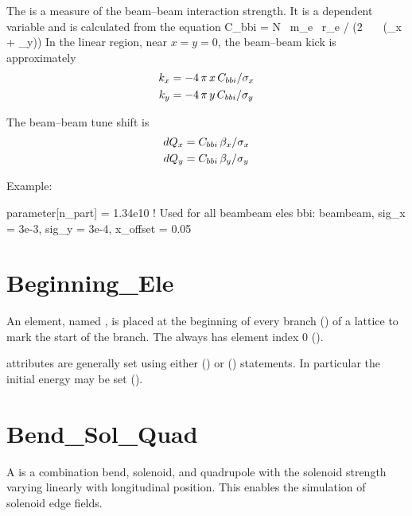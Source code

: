 The  is a measure of the beam--beam interaction
strength.  It is a dependent variable and is calculated from the
equation
\Begineq
  C_{bbi} = N \, m_e \, r_e / (2 \, \pi \, \gamma \, (\sigma_x + \sigma_y))
\Endeq
In the linear region, near $x = y = 0$, the 
beam--beam kick is approximately 
\begin{align}
  k_x &= -4\, \pi \, x \, C_{bbi} / \sigma_x \nonumber \\
  k_y &= -4\, \pi \, y \, C_{bbi} / \sigma_y 
\end{align}

The beam--beam tune shift is 
\begin{align}
  dQ_x &= C_{bbi} \, \beta_x / \sigma_x \nonumber \\
  dQ_y &= C_{bbi} \, \beta_y / \sigma_y \nonumber \\
\end{align}

Example:
\begin{example}
  parameter[n_part] = 1.34e10     ! Used for all beambeam eles
  bbi: beambeam, sig_x = 3e-3, sig_y = 3e-4, x_offset = 0.05
\end{example}

\section{Beginning_Ele}
\label{s:begin.ele}

An  element, named , is placed at the
beginning of every branch () of a lattice to mark
the start of the branch. The  always has element index 0
().

 attributes are generally set using either 
() or  () statements.
In particular the initial energy may be set ().

\section{Bend_Sol_Quad}
\label{s:bsq}

A  is a combination bend, solenoid, and quadrupole
with the solenoid strength varying linearly with longitudinal position.
This enables the simulation of solenoid edge fields. 

